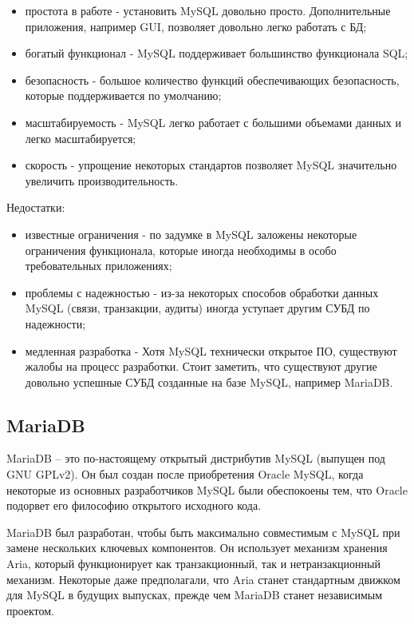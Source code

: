 \begin{itemize}
  \item простота в работе - установить MySQL довольно просто. Дополнительные приложения, например GUI, позволяет довольно легко работать с БД;
  \item богатый функционал - MySQL поддерживает большинство функционала SQL;
  \item безопасность - большое количество функций обеспечивающих безопасность, которые поддерживается по умолчанию;
  \item масштабируемость - MySQL легко работает с большими объемами данных и легко масштабируется;
  \item скорость - упрощение некоторых стандартов позволяет MySQL значительно увеличить производительность.
\end{itemize}

\hspace{0.6cm} Недостатки:

\begin{itemize}
  \item известные ограничения - по задумке в MySQL заложены некоторые ограничения функционала, которые иногда необходимы в особо требовательных приложениях;
  \item проблемы с надежностью - из-за некоторых способов обработки данных MySQL (связи, транзакции, аудиты) иногда уступает другим СУБД по надежности;
  \item медленная разработка - Хотя MySQL технически открытое ПО, существуют жалобы на процесс разработки. Стоит заметить, что существуют другие довольно успешные СУБД созданные на базе MySQL, например MariaDB.
\end{itemize}

\subsection{MariaDB}

\hspace{0.6cm} MariaDB – это по-настоящему открытый дистрибутив MySQL (выпущен под GNU GPLv2). Он был создан после приобретения Oracle MySQL, когда некоторые из основных разработчиков MySQL были обеспокоены тем, что Oracle подорвет его философию открытого исходного кода.

\hspace{0.6cm} MariaDB был разработан, чтобы быть максимально совместимым с MySQL при замене нескольких ключевых компонентов. Он использует механизм хранения Aria, который функционирует как транзакционный, так и нетранзакционный механизм. Некоторые даже предполагали, что Aria станет стандартным движком для MySQL в будущих выпусках, прежде чем MariaDB станет независимым проектом\cite{web:MariaDB}.

